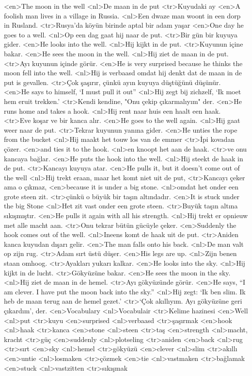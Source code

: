 <en>The moon in the well
<nl>De maan in de put
<tr>Kuyudaki ay
<en>A foolish man lives in a village in Russia.
<nl>Een dwaze man woont in een dorp in Rusland.
<tr>Rusya'da köyün birinde aptal bir adam yaşar
<en>One day he goes to a well.
<nl>Op een dag gaat hij naar de put.
<tr>Bir gün bir kuyuya gider.
<en>He looks into the well.
<nl>Hij kijkt in de put.
<tr>Kuyunun içine bakar.
<en>He sees the moon in the well.
<nl>Hij ziet de maan in de put.
<tr>Ayı kuyunun içinde görür.
<en>He is very surprised because he thinks the moon fell into the well.
<nl>Hij is verbaasd omdat hij denkt dat de maan in de put is gevallen.
<tr>Çok şaşırır, çünkü ayın kuyuya düştüğünü düşünür.
<en>He says to himself, `I must pull it out”
<nl>Hij zegt bij zichzelf, `Ik moet hem eruit trekken.'
<tr>Kendi kendine, "Onu çekip çıkarmalıyım" der.
<en>He runs home and takes a hook.
<nl>Hij rent naar huis een haalt een haak.
<tr>Eve koşar ve bir kanca alır.
<en>He goes to the well again.
<nl>Hij gaat weer naar de put.
<tr>Tekrar kuyunun yanına gider.
<en>He unties the rope from the bucket
<nl>Hij maakt het touw los van de emmer
<tr>İpi kovadan çözer.
<en>and ties it to the hook.
<nl>en knoopt het aan de haak. 
<tr>ve onu kancaya bağlar.
<en>He puts the hook into the well.
<nl>Hij steekt de haak in de put.
<tr>Kancayı kuyuya atar.
<en>He pulls it, but it doesn’t come out of the well
<nl>Hij trekt eraan, maar het komt niet uit de put,
<tr>Kancayı çeker ama o çıkmaz,
<en>because it is under a big stone.
<nl>omdat  het onder een grote steen zit.
<tr>çünkü o büyük bir taşın altındadır.
<en>It is stuck under the big Stone
<nl>Het zit vast onder een grote steen.
<tr>Buyük taşın altına sıkışmıştır.
<en>He pulls it again with all his strength.
<nl>Hij trekt er opnieuw met alle macht aan. 
<tr>Onu tekrar bütün gücüyle çeker.
<en>Suddenly the hook comes out of the well.
<nl>Ineens komt de haak uit de put.
<tr>Aniden kanca kuyudan dışarı gelir.
<en>The man falls onto his back.
<nl>De man valt op zijn rug.
<tr>Adam sırt üstü düşer.
<en>His legs are up.
<nl>Zijn benen staan omhoog. 
<tr>Ayakları yukarı kalkar.
<en>He looks into the sky.
<nl>Hij kijkt in de lucht.
<tr>Gökyüzüne bakar.
<en>He sees the moon in the sky.
<nl>Hij ziet de maan in de hemel.
<tr>Ayı gökyüzünde görür.
<en>He says, “I am clever. I have put the moon back into the sky.”
<nl>Hij zegt: `Ik ben slim. Ik heb de maan terug aan de hemel gezet.' 
<tr>`Çok akıllıyım. Ayı gökyüzüne geri çıkardım', der.
<en>Vocabulary
<nl>Vocabulair
<tr>Kelime hazinesi
<en>Well
<nl>put
<tr>kuyu
<en>surprised
<nl>verbaasd
<tr>şaşırmak
<en>hook
<nl>haak
<tr>kanca
<en>stone
<nl>steen
<tr>taş
<en>strength
<nl>macht, kracht
<tr>güç
<en>suddenly
<nl>plotseling
<tr>aniden
<en>back
<nl>rug
<tr>sırt
<en>sky
<nl>hemel
<tr>gökyüzü
<en>clever
<nl>slim
<tr>akıllı
<en>untie
<nl>losmaken
<tr>çözmek
<en>tie
<nl>vastmaken
<tr>bağlamak
<en>stuck
<nl>vastzitten
<tr>sıkışmak
